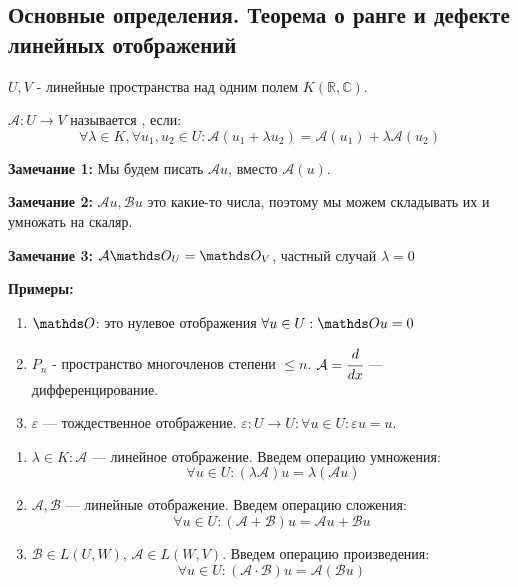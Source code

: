 \subsection{Основные определения. Теорема о ранге и дефекте линейных отображений}

 $U,V$ - линейные пространства над одним полем $K(\mathbb{R}, \mathbb{C})$.

$\mathcal{A}: U\rightarrow V$ называется , если:
$$\forall \lambda \in K,\forall u_1, u_2 \in U: \mathcal{A}(u_1 + \lambda u_2) = \mathcal{A} (u_1) + \lambda\mathcal{A}(u_2)$$

\textbf{Замечание 1:} Мы будем писать $\mathcal{A} u$, вместо $\mathcal{A}(u)$.

\textbf{Замечание 2:} $\mathcal{A}u, \mathcal{B}u$ это какие-то числа, поэтому мы можем складывать их и умножать на скаляр.

\textbf{Замечание 3:} $\mathcal{A} \zero_U = \zero_V$, частный случай $\lambda = 0$

\textbf{Примеры:}
\begin{enumerate}
    \item $\zero$: это нулевое отображения $\forall u \in U: \zero u = 0$

     \item $P_n$ - пространство многочленов степени $\leq n$. $\mathcal{A}=\cfrac{d}{dx}$ --- дифференцирование.

    \item $\varepsilon$ --- тождественное отображение. $\varepsilon: U\rightarrow U:\forall u\in U: \varepsilon u = u$.
\end{enumerate}


\begin{enumerate}
    \item $\lambda \in K: \mathcal{A}$ --- линейное отображение. Введем операцию умножения:
$$\ \forall u \in U: (\lambda\mathcal{A}) u = \lambda(\mathcal{A} u)$$
    \item $\mathcal{A}, \mathcal{B}$ --- линейные отображение. Введем операцию сложения:
    $$ \forall u \in U:(\mathcal{A} + \mathcal{B}) u = \mathcal{A}u + \mathcal{B}u $$


    \item  $\mathcal{B}\in L(U,W)$, $\mathcal{A} \in L(W,V)$. Введем операцию произведения:
    $$\forall u \in U:(\mathcal{A} \cdot \mathcal{B}) u = \mathcal{A}(\mathcal{B}u)$$

\end{enumerate}


